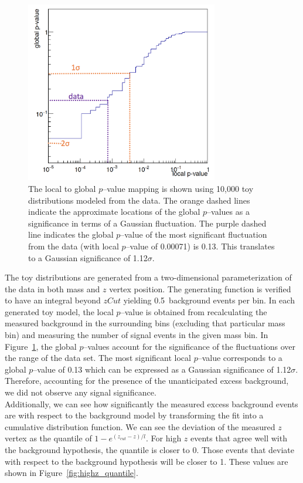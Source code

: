 \begin{figure}[htb]
  \centering
      \includegraphics[width=0.75\textwidth]{pics/results/pvalMap.png}
  \caption[Mapping of local to global $p$--values]{The local to global $p$--value mapping is shown using 10,000 toy distributions modeled from the data. The orange dashed lines indicate the approximate locations of the global $p$--values as a significance in terms of a Gaussian fluctuation. The purple dashed line indicates the global $p$--value of the most significant fluctuation from the data (with local $p$--value of 0.00071) is 0.13. This translates to a Gaussian significance of 1.12$\sigma$.}
  \label{fig:pval_map}
\end{figure} 
The toy distributions are generated from a two-dimensional parameterization of the data in both mass and $z$ vertex position. The generating function is verified to have an integral beyond $zCut$ yielding 0.5~background events per bin. In each generated toy model, the local $p$--value is obtained from recalculating the measured background in the surrounding bins (excluding that particular mass bin) and measuring the number of signal events in the given mass bin. In Figure~\ref{fig:pval_map}, the global $p$--values account for the significance of the fluctuations over the range of the data set. The most significant local $p$--value corresponds to a global $p$--value of 0.13 which can be expressed as a Gaussian significance of 1.12$\sigma$. Therefore, accounting for the presence of the unanticipated excess background, we did not observe any signal significance. \\
\indent Additionally, we can see how significantly the measured excess background events are with respect to the background model by transforming the fit into a cumulative distribution function. We can see the deviation of the measured $z$ vertex as the quantile of $1-e^{(z_{cut}-z)/l}$. For high $z$ events that agree well with the background hypothesis, the quantile is closer to 0. Those events that deviate with respect to the background hypothesis will be closer to 1. These values are shown in Figure~\ref{fig:highz_quantile}.


